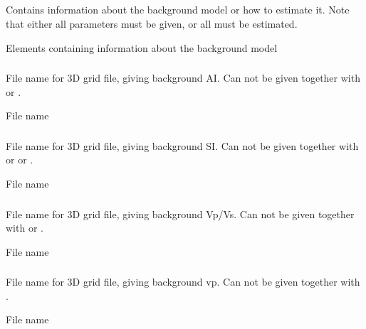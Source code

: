 \subsection{}
 \slist
   \item \Description Contains information about the background model or how to estimate it. Note that either all parameters must be given, or all must be estimated.
   \item \Argument Elements containing information about the background model
   \item \Default
 \elist

\subsubsection{}
 \slist
   \item \Description File name for 3D grid file, giving background
   AI. Can not be given together with  or .
   \item \Argument File name
   \item \Default
 \elist

\subsubsection{}
 \slist
   \item \Description File name for 3D grid file, giving background
   SI. Can not be given together with  or 
   or .
   \item \Argument File name
   \item \Default
 \elist

\subsubsection{}
 \slist
   \item \Description File name for 3D grid file, giving background
   Vp/Vs. Can not be given together with  or .
   \item \Argument File name
   \item \Default
 \elist

\subsubsection{}
 \slist
   \item \Description File name for 3D grid file, giving background vp. Can not be given together with .
   \item \Argument File name
   \item \Default
 \elist

